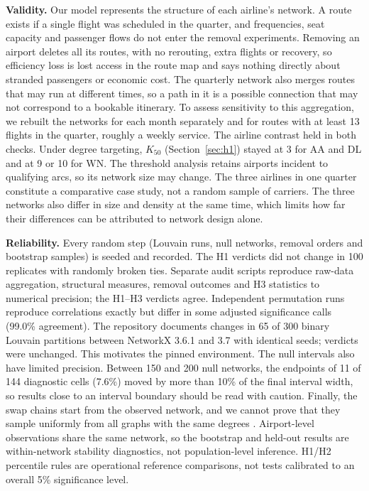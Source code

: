 \documentclass[12pt, a4paper]{article}
\begin{document}
\textbf{Validity.} Our model represents the structure of each airline's network. A
route exists if a single flight was scheduled in the quarter, and frequencies, seat
capacity and passenger flows do not enter the removal experiments. Removing an airport
deletes all its routes, with no rerouting, extra flights or recovery, so efficiency
loss is lost access in the route map and says nothing directly about stranded
passengers or economic cost. The quarterly network also merges routes
that may run at different times, so a path in it is a possible connection that may
not correspond to a bookable itinerary.
To assess sensitivity to this aggregation, we rebuilt the networks for each month separately and for routes with at
least 13 flights in the quarter, roughly a weekly service. The airline contrast held in both checks.
Under degree targeting, $K_{50}$ (Section~\ref{sec:h1}) stayed at 3 for AA and DL and
at 9 or 10 for WN. The threshold analysis retains airports incident to qualifying arcs, so its network size may change.
The three airlines in one quarter constitute a comparative case study, not a random sample of carriers. The three networks also differ in size and density at the same
time, which limits how far their differences can be attributed to network design
alone.

\textbf{Reliability.} Every random step (Louvain runs, null networks, removal
orders and bootstrap samples) is seeded and recorded. The H1 verdicts did not change in 100 replicates with randomly broken ties.
Separate audit scripts reproduce raw-data aggregation, structural measures, removal outcomes and H3 statistics to numerical precision; the H1--H3 verdicts agree. Independent permutation runs reproduce correlations exactly but differ in some adjusted significance calls (99.0\% agreement). The repository documents changes in 65 of 300 binary Louvain partitions between NetworkX 3.6.1 and 3.7 with identical seeds; verdicts were unchanged. This motivates the pinned environment. The null
intervals also have limited precision. Between 150 and 200 null networks, the
endpoints of 11 of 144 diagnostic cells (7.6\%) moved by more than 10\% of the final interval width, so results close to an interval boundary should be read with caution. Finally,
the swap chains start from the observed network, and we cannot prove that they sample
uniformly from all graphs with the same degrees \cite{fosdick2018}. Airport-level observations share the same network, so the bootstrap and held-out results are within-network stability diagnostics, not population-level inference. H1/H2 percentile rules are operational reference comparisons, not tests calibrated to an overall 5\% significance level.
\end{document}
